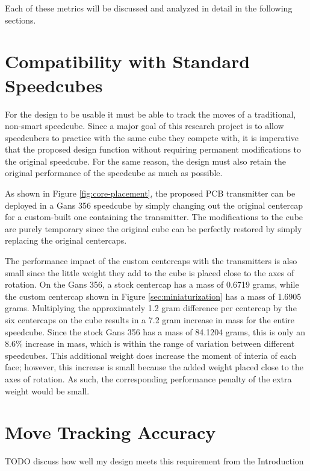 Each of these metrics will be discussed and analyzed in detail in the
following sections.

\section{Compatibility with Standard Speedcubes}
\label{sec:compatibility-with-standard-speedcubes}

For the design to be usable it must be able to track the moves of a
traditional, non-smart speedcube. Since a major goal of this research
project is to allow speedcubers to practice with the same cube they
compete with, it is imperative that the proposed design function
without requiring permanent modifications to the original speedcube.
For the same reason, the design must also retain the original
performance of the speedcube as much as possible.

As shown in Figure \ref{fig:core-placement}, the proposed PCB
transmitter can be deployed in a Gans 356 speedcube by simply changing
out the original centercap for a custom-built one containing the
transmitter. The modifications to the cube are purely temporary since
the original cube can be perfectly restored by simply replacing the
original centercaps.

The performance impact of the custom centercaps with the transmitters
is also small since the little weight they add to the cube is placed
close to the axes of rotation. On the Gans 356, a stock centercap has a
mass of 0.6719 grams, while the custom centercap shown in Figure
\ref{sec:miniaturization} has a mass of 1.6905 grams. Multiplying the
approximately 1.2 gram difference per centercap by the six centercaps
on the cube results in a 7.2 gram increase in mass for the entire
speedcube. Since the stock Gans 356 has a mass of 84.1204 grams, this
is only an 8.6\% increase in mass, which is within the range of
variation between different speedcubes. This additional weight does
increase the moment of interia of each face; however, this increase is
small because the added weight placed close to the axes of rotation. As
such, the corresponding performance penalty of the extra weight would
be small.


\section{Move Tracking Accuracy}
\label{sec:move-tracking-accuracy}

TODO discuss how well my design meets this requirement from the Introduction

